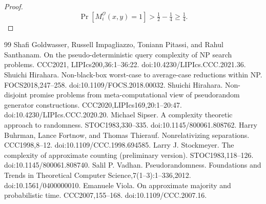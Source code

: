 \documentclass[10pt,a4paper]{article}
\begin{document}
\begin{proof}
\[\Pr[M_i^{\mathcal O}(x,y)=1]>\tfrac12-\tfrac14\geq\tfrac14.\]
\end{proof}

\begin{thebibliography}{99}
 Shafi Goldwasser, Russell Impagliazzo, Toniann Pitassi, and Rahul Santhanam. On the pseudo-deterministic query complexity of NP search problems. CCC2021, LIPIcs200,36:1--36:22. doi:10.4230/LIPIcs.CCC.2021.36.
 Shuichi Hirahara. Non-black-box worst-case to average-case reductions within NP. FOCS2018,247--258. doi:10.1109/FOCS.2018.00032.
 Shuichi Hirahara. Non-disjoint promise problems from meta-computational view of pseudorandom generator constructions. CCC2020,LIPIcs169,20:1--20:47. doi:10.4230/LIPIcs.CCC.2020.20.
 Michael Sipser. A complexity theoretic approach to randomness. STOC1983,330--335. doi:10.1145/800061.808762.
 Harry Buhrman, Lance Fortnow, and Thomas Thierauf. Nonrelativizing separations. CCC1998,8--12. doi:10.1109/CCC.1998.694585.
 Larry J. Stockmeyer. The complexity of approximate counting (preliminary version). STOC1983,118--126. doi:10.1145/800061.808740.
 Salil P. Vadhan. Pseudorandomness. Foundations and Trends in Theoretical Computer Science,7(1--3):1--336,2012. doi:10.1561/0400000010.
 Emanuele Viola. On approximate majority and probabilistic time. CCC2007,155--168. doi:10.1109/CCC.2007.16.
\end{thebibliography}
\end{document}
